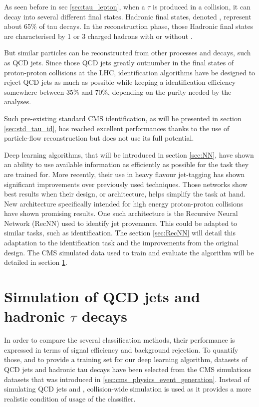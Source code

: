 
As seen before in sec \ref{sec:tau_lepton}, when a $\tau$ is produced in a collision, it can decay into several different final states.
Hadronic final states, denoted \tauh, represent about 65\% of tau decays.
In the reconstruction phase, those Hadronic final states are characterised by 1 or 3 charged hadrons with or without \pizero .

But similar particles can be reconstructed from other processes and decays, such as QCD jets.
Since those QCD jets greatly outnumber \tauh in the final states of proton-proton collisions at the LHC, \tauh identification algorithms have be designed to reject QCD jets as much as possible while keeping a \tauh identification efficiency somewhere between 35\% and 70\%, depending on the purity needed by the analyses.

Such pre-existing standard CMS identification, as will be presented in section \ref{sec:std_tau_id}, has reached excellent performances thanks to the use of particle-flow reconstruction but does not use its full potential.

Deep learning algorithms, that will be introduced in section \ref{sec:NN}, have shown an ability to use available information as efficiently as possible for the task they are trained for. More recently, their use in heavy flavour jet-tagging \cite{btagging_NN} has shown significant improvements over previously used techniques. Those networks show best results when their design, or architecture, helps simplify the task at hand. New architecture specifically intended for high energy proton-proton collisions have shown promising results. One such architecture is the Recursive Neural Network (RecNN) \cite{Louppe:2017ipp} used to identify jet provenance. This could be adapted to similar tasks, such as \tauh identification. The section \ref{sec:RecNN} will detail this adaptation to the \tauh identification task and the improvements from the original design.
The CMS simulated data used to train and evaluate the algorithm will be detailed in section \ref{sec:NN_datasets}.

\section{Simulation of QCD jets and hadronic $\tau$ decays}
\label{sec:NN_datasets}

In order to compare the several classification methods, their performance is expressed in terms of signal efficiency and background rejection. To quantify those, and to provide a training set for our deep learning algorithm, datasets of QCD jets and hadronic tau decays have been selected from the CMS simulations datasets that was introduced in \ref{sec:cms_physics_event_generation}. Instead of simulating QCD jets and \tauh, collision-wide simulation is used as it provides a more realistic condition of usage of the classifier.


